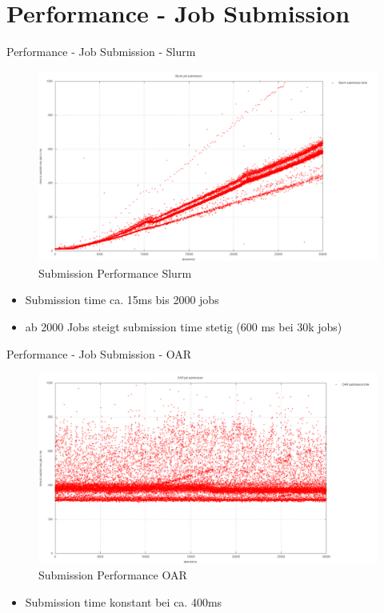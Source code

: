 \documentclass[10pt,utf8]{beamer}
\begin{document}
\section{Performance - Job Submission}
\begin{frame}{Performance - Job Submission - Slurm}
    \begin{figure}
    \centering
	\includegraphics[scale=0.18, keepaspectratio]{../output/pics/slurm.png}
    \caption{Submission Performance Slurm}
    \end{figure}
    \begin{itemize}
        \item{Submission time ca. 15ms bis 2000 jobs}
        \item{ab 2000 Jobs steigt submission time stetig (600 ms bei 30k jobs)}
    \end{itemize}
\end{frame}

\begin{frame}{Performance - Job Submission - OAR}
    \begin{figure}
    \centering
	\includegraphics[scale=0.20, keepaspectratio]{../output/pics/oar.png}
    \caption{Submission Performance OAR}
    \end{figure}
    \begin{itemize}
        \item{Submission time konstant bei ca. 400ms }
    \end{itemize}
\end{frame}
\end{document}
